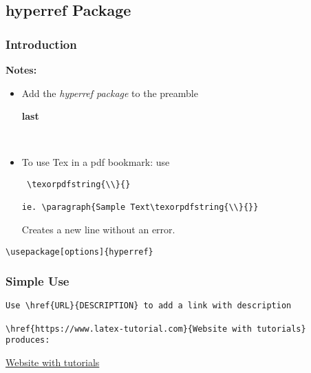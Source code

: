 \documentclass[class=article, crop=false, titlepage, twoside, multi={itemize, figure, verbatim}, float=false]{standalone}
\title{}  %
\begin{document}

\ifstandalone
\maketitle %
\clearpage
\tableofcontents %
\clearpage
\fi

\subsection[hyperref Package]{\LARGE hyperref Package}

\subsubsection[Introduction]{\Large Introduction}

\textbf{Notes:}
\begin{itemize}
\item Add the \textit{hyperref package} to the preamble\begin{large}\textbf{ last}\end{large}~\cite{hyperref}
\item To use Tex in a pdf bookmark: use \begin{verbatim} \texorpdfstring{\\}{}

ie. \paragraph{Sample Text\texorpdfstring{\\}{}}\end{verbatim}
Creates a new line without an error.
\end{itemize}

\begin{verbatim}\usepackage[options]{hyperref}\end{verbatim}

\subsubsection[Simple Use]{\Large Simple Use}
\begin{verbatim}Use \href{URL}{DESCRIPTION} to add a link with description

\href{https://www.latex-tutorial.com}{Website with tutorials}
produces:
\end{verbatim}
\href{https://www.latex-tutorial.com}{Website with tutorials}
\end{document}
